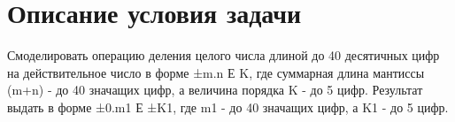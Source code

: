 \chapter{Описание условия задачи}
Смоделировать операцию деления целого числа длиной до
40 десятичных цифр на действительное число в форме
±m.n Е K, где суммарная длина мантиссы (m+n) - до 40
значащих цифр, а величина порядка K - до 5 цифр.
Результат выдать в форме ±0.m1 Е ±K1, где m1 - до 40
значащих цифр, а K1 - до 5 цифр.

